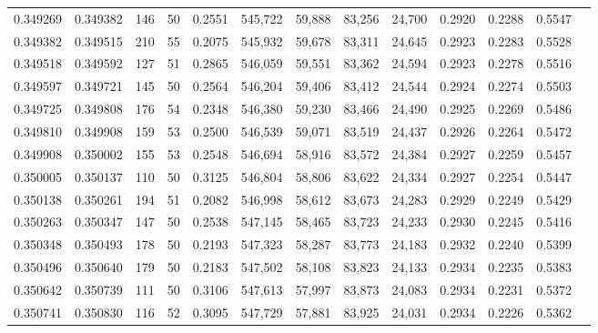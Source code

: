 \begin{tabular}{rrrrrrrrrrrrr}
0.349269 & 0.349382 &   146 &  50 &                                     0.2551 & 545,722 &  59,888 &  83,256 &  24,700 & 0.2920 & 0.2288 & 0.5547 \\
0.349382 & 0.349515 &   210 &  55 &                                     0.2075 & 545,932 &  59,678 &  83,311 &  24,645 & 0.2923 & 0.2283 & 0.5528 \\
0.349518 & 0.349592 &   127 &  51 &                                     0.2865 & 546,059 &  59,551 &  83,362 &  24,594 & 0.2923 & 0.2278 & 0.5516 \\
0.349597 & 0.349721 &   145 &  50 &                                     0.2564 & 546,204 &  59,406 &  83,412 &  24,544 & 0.2924 & 0.2274 & 0.5503 \\
0.349725 & 0.349808 &   176 &  54 &                                     0.2348 & 546,380 &  59,230 &  83,466 &  24,490 & 0.2925 & 0.2269 & 0.5486 \\
0.349810 & 0.349908 &   159 &  53 &                                     0.2500 & 546,539 &  59,071 &  83,519 &  24,437 & 0.2926 & 0.2264 & 0.5472 \\
0.349908 & 0.350002 &   155 &  53 &                                     0.2548 & 546,694 &  58,916 &  83,572 &  24,384 & 0.2927 & 0.2259 & 0.5457 \\
0.350005 & 0.350137 &   110 &  50 &                                     0.3125 & 546,804 &  58,806 &  83,622 &  24,334 & 0.2927 & 0.2254 & 0.5447 \\
0.350138 & 0.350261 &   194 &  51 &                                     0.2082 & 546,998 &  58,612 &  83,673 &  24,283 & 0.2929 & 0.2249 & 0.5429 \\
0.350263 & 0.350347 &   147 &  50 &                                     0.2538 & 547,145 &  58,465 &  83,723 &  24,233 & 0.2930 & 0.2245 & 0.5416 \\
0.350348 & 0.350493 &   178 &  50 &                                     0.2193 & 547,323 &  58,287 &  83,773 &  24,183 & 0.2932 & 0.2240 & 0.5399 \\
0.350496 & 0.350640 &   179 &  50 &                                     0.2183 & 547,502 &  58,108 &  83,823 &  24,133 & 0.2934 & 0.2235 & 0.5383 \\
0.350642 & 0.350739 &   111 &  50 &                                     0.3106 & 547,613 &  57,997 &  83,873 &  24,083 & 0.2934 & 0.2231 & 0.5372 \\
0.350741 & 0.350830 &   116 &  52 &                                     0.3095 & 547,729 &  57,881 &  83,925 &  24,031 & 0.2934 & 0.2226 & 0.5362 \\

\end{tabular}

